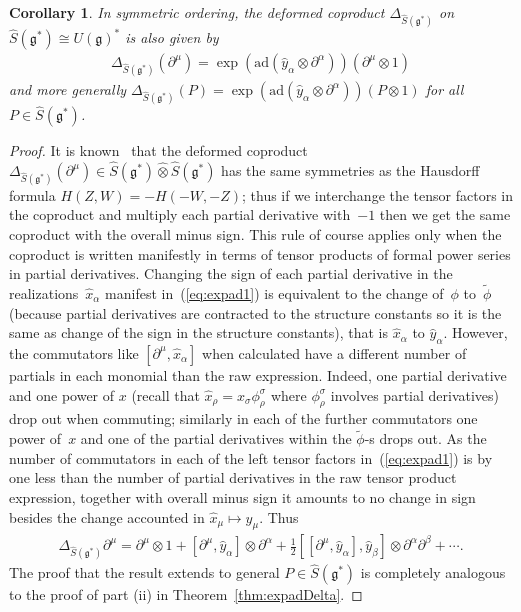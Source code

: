 \documentclass[pdftex]{sigma}
\def\gg{\mathfrak{g}}
\def\hx{\hat{x}}
\def\hy{\hat{y}}
\newtheorem{Corollary}[Theorem]{Corollary}
\numberwithin{equation}{section}
\begin{document}
\begin{Corollary}\label{cor:expady}
In symmetric ordering, the deformed coproduct $\Delta_{\hat{S}(\gg^*)}$ on
$\hat{S}(\gg^*)\cong U(\gg)^*$ is also given by
\begin{gather}\label{eq:expad2}
\Delta_{\hat{S}(\gg^*)}(\partial^\mu) = \exp(\mathrm{ad}(\hy_\alpha\otimes\partial^\alpha))
(\partial^\mu\otimes 1)
\end{gather}
and more generally $\Delta_{\hat{S}(\gg^*)}(P) = \exp(\mathrm{ad}(\hy_\alpha\otimes\partial^\alpha))(P\otimes 1)$ for all $P\in\hat{S}(\gg^*)$.
\end{Corollary}
\begin{proof} It is known~\cite{scopr} that the deformed coproduct $\Delta_{\hat{S}(\gg^*)}(\partial^\mu)\in \hat{S}(\gg^*)\hat\otimes\hat{S}(\gg^*)$ has the same symmetries as the Hausdorff formula $H(Z,W) = -H(-W,-Z)$; thus if we interchange the tensor factors in the coproduct and multiply each partial derivative with~$-1$ then we get the same coproduct with the overall minus sign. This rule of course applies only when the coproduct is written manifestly in terms of tensor products of formal power series in partial derivatives. Changing the sign of each partial derivative in the realizations~$\hat{x}_\alpha$ manifest in~(\ref{eq:expad1}) is equivalent to the change of~$\phi$ to~$\tilde\phi$ (because partial derivatives are contracted to the structure constants so it is the same as change of the sign in the structure constants), that is $\hat{x}_\alpha$ to $\hat{y}_\alpha$. However, the commutators like $[\partial^\mu,\hx_\alpha]$ when calculated have a different number of partials in each monomial than the raw expression. Indeed, one partial derivative and one power of $x$ (recall that $\hx_\rho = x_\sigma\phi^\sigma_\rho$ where $\phi^\sigma_\rho$ involves partial derivatives) drop out when commuting; similarly in each of the further commutators one power of~$x$ and one of the partial derivatives within the $\tilde\phi$-s drops out. As the number of commutators in each of the left tensor factors in~(\ref{eq:expad1}) is by one less than the number of partial derivatives in the raw tensor product expression, together with overall minus sign it amounts to no change in sign besides the change accounted in $\hx_\mu\mapsto\hy_\mu$. Thus
\begin{gather*} \Delta_{\hat{S}(\gg^*)} \partial^\mu = \partial^\mu\otimes 1 +
[\partial^\mu,\hat{y}_\alpha]\otimes \partial^\alpha + \frac{1}{2}
[[\partial^\mu,\hat{y}_\alpha],\hat{y}_\beta]\otimes \partial^\alpha\partial^\beta + \cdots.
\end{gather*}
The proof that the result extends to general $P\in\hat{S}(\gg^*)$ is completely analogous to the proof of part (ii) in Theorem~\ref{thm:expadDelta}.
\end{proof}
\end{document}
